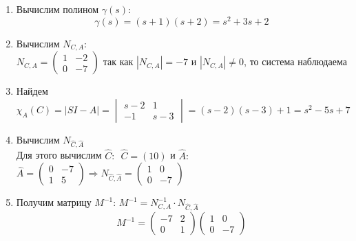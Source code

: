 \documentclass[../../TAU.tex]{subfiles}
\begin{document}
    \begin{enumerate}
        \item Вычислим полином $\gamma(s)$:
            $$\gamma(s)=(s+1)(s+2)=s^2+3s+2$$
        \item Вычислим $N_{C, A}$:\\
            $
                N_{C, A} =
                \begin{pmatrix}
                 1 & -2\\
                 0 & -7
                \end{pmatrix} 
            $
            так как $|N_{C, A}|=-7$ и $|N_{C, A}|\neq0$, то система наблюдаема
        \item Найдем 
        $
            \chi_A(C)=|SI-A|=
            \begin{vmatrix}
                s-2 & 1\\
                -1 & s-3
            \end{vmatrix}
            =(s-2)(s-3)+1=s^2-5s+7
        $
        \item Вычислим $N_{\widehat C,\widehat A}$\\
            Для этого вычислим $\widehat C:$\ \quad$\widehat C=(10)$
            и $\widehat A:$\\
            $
                \widehat A=
                \begin{pmatrix}
                    0 & -7\\
                    1 & 5
                \end{pmatrix}
                \Rightarrow
                N_{\widehat C,\widehat A} =
                \begin{pmatrix}
                    1 & 0\\
                    0 & -7
                \end{pmatrix}
            $ 
        \item Получим матрицу $M^{-1}$: $M^{-1}=N_{C, A}^{-1}\cdot N_{\widehat C, \widehat A}$\\
            $$
                M^{-1}=
                \begin{pmatrix}
                    -7 & 2\\
                    0 & 1
                \end{pmatrix}
                \begin{pmatrix}
                    1 & 0\\
                    0 & -7
                \end{pmatrix}
$$
\end{enumerate}
\end{document}
